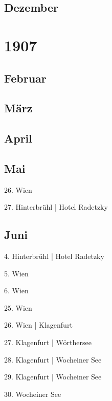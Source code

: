 \documentclass[twoside=false,titlepage=false,open=any, parskip=never, fontsize=10pt, headings=small, chapterprefix=false, appendixprefix=false, DIV=15]{scrbook}
\begin{document}
\begin{multicols}{3}
            \section*{Dezember}
            \chapter*{1907}
            \section*{Februar}
            \section*{März}
            \section*{April}
            \section*{Mai}
            26. Wien\par
            27. Hinterbrühl | Hotel Radetzky\par
            \section*{Juni}
            4. Hinterbrühl | Hotel Radetzky\par
            5. Wien\par
            6. Wien\par
            25. Wien\par
            26. Wien | Klagenfurt\par
            27. Klagenfurt | Wörthersee\par
            28. Klagenfurt | Wocheiner See\par
            29. Klagenfurt | Wocheiner See\par
            30. Wocheiner See\par

\end{multicols}
\end{document}
